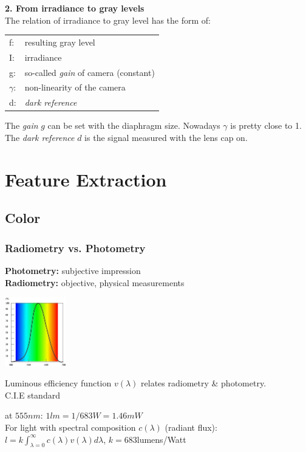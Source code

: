 \documentclass[a4paper, fontsize=8pt, landscape, DIV=1]{scrartcl}
\begin{document}
\begin{multicols*}{4}
		\textbf{2. From irradiance to gray levels}\\
		The relation of irradiance to gray level has the form of: 
		\begin{tabular}{l l}
			f:&  resulting gray level\\ 
			I:&  irradiance\\ 
			g:&  so-called \textit{gain} of camera (constant)\\ 
			$\gamma$:&  non-linearity of the camera \\ 
			d:&  \textit{dark reference}\\  
		\end{tabular}
		\par 
		The \textit{gain} $g$ can be set with the diaphragm size. Nowadays $\gamma$ is pretty close to 1. The \textit{dark reference} $d$ is the signal measured with the lens cap on. 
		\par 
		\vfill\null
		\columnbreak
		
		\section{Feature Extraction}	
		\subsection{Color}
		\subsubsection{Radiometry vs. Photometry}
		\textbf{Photometry:} subjective impression\\
		\textbf{Radiometry:} objective, physical measurements
		\par 
		\begin{minipage}[b]{0.49\columnwidth}
			\begin{flushleft}
				\includegraphics[width=\columnwidth, height=3cm]{images/FeatureExt/luminous_eff.png}\\
			\end{flushleft}
		\end{minipage}
		\begin{minipage}[b]{0.49\columnwidth}
			\begin{flushleft}
				Luminous efficiency function $v(\lambda)$ relates radiometry \& photometry.\\
				C.I.E standard
				\vspace{0.5cm}
			\end{flushleft}
		\end{minipage}
		at $555nm$: $1lm=1/683W=1.46mW$\\
		For light with spectral composition $c(\lambda)$ (radiant flux):\\
		$l=k\int_{\lambda=0}^{\infty}c(\lambda)v(\lambda)d\lambda$, $k=683$lumens/Watt
		

\end{multicols*}
\end{document}
